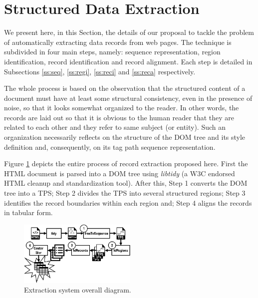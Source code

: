 \vspace{-0.7cm}

\section{Structured Data Extraction}\label{sec:prop} We present here, in this
Section, the details of our proposal to tackle the problem of automatically
extracting data records from web pages. The technique is subdivided in four main
steps, namely:
sequence representation, region identification, record identification and record
alignment. Each step is detailed in Subsections \ref{ss:seq}, \ref{ss:regi},
\ref{ss:reci} and \ref{ss:reca} respectively.


The whole process is based on the observation that the structured content of a
document must have at least some structural consistency, even in the presence of
noise, so that it looks somewhat organized to the reader. 
In other words, the records are laid out so that it is obvious to the human
reader that they are related to each other and they refer to same subject (or
entity). Such an organization necessarily reflects on the structure of the DOM
tree and its style definition and, consequently, on its tag path sequence
representation.

Figure \ref{fig:overall} depicts the entire process of record extraction
proposed here. First the HTML document is parsed into a DOM tree using
\textit{libtidy} (a W3C endorsed HTML cleanup and standardization tool).
After this, Step 1 converts the DOM tree into a TPS; Step 2 divides the TPS into
several structured regions; Step 3 identifies the record boundaries within each
region and; Step 4 aligns the records in tabular form.


\begin{figure}[h]
  \centering
     \includegraphics[width=160pt]{img/proposal.jpg}
  \caption{\small{Extraction system overall diagram.}}
  \label{fig:overall}
\end{figure}

